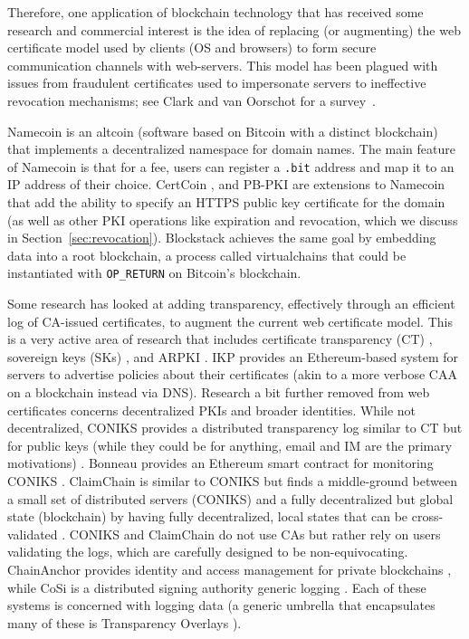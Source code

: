 Therefore, one application of blockchain technology that has received some research and commercial interest is the idea of replacing (or augmenting) the web certificate model used by clients (OS and browsers) to form secure communication channels with web-servers. This model has been plagued with issues from fraudulent certificates used to impersonate servers to ineffective revocation mechanisms; see Clark and van Oorschot for a survey~\cite{CO13}. 

Namecoin is an altcoin (software based on Bitcoin with a distinct blockchain) that implements a decentralized namespace for domain names\cite{Kalodner2015empirical}. The main feature of Namecoin is that for a fee, users can register a \texttt{.bit} address and map it to an IP address of their choice.  CertCoin \cite{fromknecht2014certcoin}, and PB-PKI \cite{axon2016pb} are extensions to Namecoin that add the ability to specify an HTTPS public key certificate for the domain (as well as other PKI operations like expiration and revocation, which we discuss in Section~\ref{sec:revocation}). Blockstack \cite{ali2016blockstack} achieves the same goal by embedding data into a root blockchain, a process called virtualchains that could be instantiated with \texttt{OP\_RETURN} on Bitcoin's blockchain. 

Some research has looked at adding transparency, effectively through an efficient log of CA-issued certificates, to augment the current web certificate model. This is a very active area of research that includes certificate transparency (CT) \cite{laurie2014certificate}, sovereign keys (SKs) \cite{giteffor4:online}, and ARPKI \cite{basin2014arpki}. IKP \cite{matsumoto2016ikp} provides an Ethereum-based system for servers to advertise policies about their certificates (akin to a more verbose CAA on a blockchain instead via DNS). Research a bit further removed from web certificates concerns decentralized PKIs and broader identities. While not decentralized, CONIKS provides a distributed transparency log similar to CT but for public keys (while they could be for anything, email and IM are the primary motivations) \cite{melara2015coniks}. Bonneau provides an Ethereum smart contract for monitoring CONIKS \cite{bonneau2016ethiks}. ClaimChain is similar to CONIKS but finds a middle-ground between a small set of distributed servers (CONIKS) and a fully decentralized but global state (blockchain) by having fully decentralized, local states that can be cross-validated \cite{kulynych2017claimchain}. CONIKS and ClaimChain do not use CAs but rather rely on users validating the logs, which are carefully designed to be non-equivocating. ChainAnchor provides identity and access management for private blockchains \cite{hardjonoverifiable}, while CoSi is a distributed signing authority generic logging \cite{syta2016keeping}. Each of these systems is concerned with logging data (a generic umbrella that encapsulates many of these is Transparency Overlays \cite{chase2016transparency}). 

